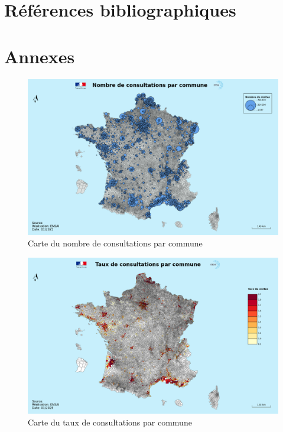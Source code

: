 \documentclass[
]{article}
\begin{document}
\section{Références
bibliographiques}\label{ruxe9fuxe9rences-bibliographiques}

\section{Annexes}\label{annexes}

\begin{figure}
    \centering
    \includegraphics[width=1\linewidth]{../cartes/nombre_de_consulatations}
    \caption{Carte du nombre de consultations par commune}
    \label{fig:figure}
\end{figure}
\begin{figure}
    \centering
    \includegraphics[width=1\linewidth]{../cartes/taux_de_consultations}
    \caption{Carte du taux de consultations par commune}
    \label{fig:figure}
\end{figure}
\end{document}
